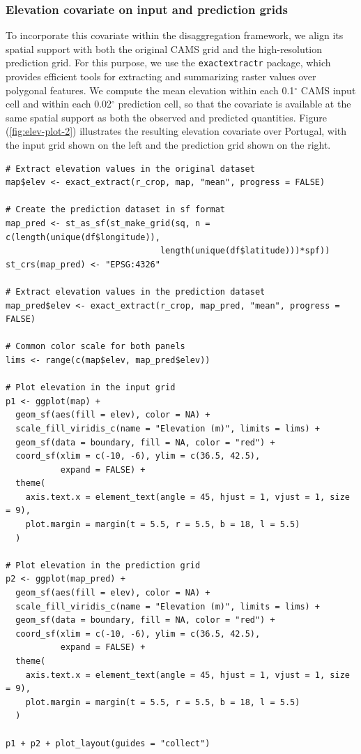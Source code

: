 \subsubsection{Elevation covariate on input and prediction grids}\label{elevation-covariate-on-input-and-prediction-grids}

To incorporate this covariate within the disaggregation framework, we align its spatial support with both the original CAMS grid and the high-resolution prediction grid. For this purpose, we use the \texttt{exactextractr} package, which provides efficient tools for extracting and summarizing raster values over polygonal features. We compute the mean elevation within each 0.1\(^\circ\) CAMS input cell and within each 0.02\(^\circ\) prediction cell, so that the covariate is available at the same spatial support as both the observed and predicted quantities. Figure (\ref{fig:elev-plot-2}) illustrates the resulting elevation covariate over Portugal, with the input grid shown on the left and the prediction grid shown on the right.

\begin{verbatim}
# Extract elevation values in the original dataset
map$elev <- exact_extract(r_crop, map, "mean", progress = FALSE)

# Create the prediction dataset in sf format
map_pred <- st_as_sf(st_make_grid(sq, n = c(length(unique(df$longitude)),
                               length(unique(df$latitude)))*spf))
st_crs(map_pred) <- "EPSG:4326"

# Extract elevation values in the prediction dataset
map_pred$elev <- exact_extract(r_crop, map_pred, "mean", progress = FALSE)

# Common color scale for both panels
lims <- range(c(map$elev, map_pred$elev))

# Plot elevation in the input grid
p1 <- ggplot(map) +
  geom_sf(aes(fill = elev), color = NA) +
  scale_fill_viridis_c(name = "Elevation (m)", limits = lims) +
  geom_sf(data = boundary, fill = NA, color = "red") +
  coord_sf(xlim = c(-10, -6), ylim = c(36.5, 42.5),
           expand = FALSE) +
  theme(
    axis.text.x = element_text(angle = 45, hjust = 1, vjust = 1, size = 9),
    plot.margin = margin(t = 5.5, r = 5.5, b = 18, l = 5.5)
  )

# Plot elevation in the prediction grid
p2 <- ggplot(map_pred) +
  geom_sf(aes(fill = elev), color = NA) +
  scale_fill_viridis_c(name = "Elevation (m)", limits = lims) +
  geom_sf(data = boundary, fill = NA, color = "red") +
  coord_sf(xlim = c(-10, -6), ylim = c(36.5, 42.5),
           expand = FALSE) +
  theme(
    axis.text.x = element_text(angle = 45, hjust = 1, vjust = 1, size = 9),
    plot.margin = margin(t = 5.5, r = 5.5, b = 18, l = 5.5)
  )

p1 + p2 + plot_layout(guides = "collect")
\end{verbatim}

